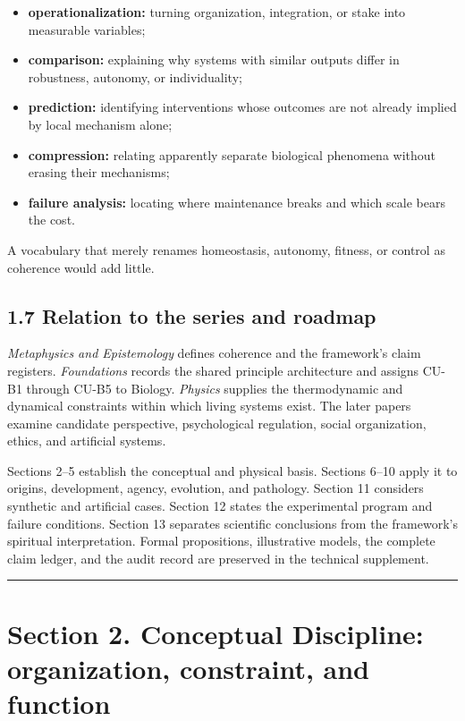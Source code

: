 \documentclass[
  11pt,
]{article}
\providecommand{\tightlist}{%
  \setlength{\itemsep}{0pt}\setlength{\parskip}{0pt}}
\begin{document}
\begin{itemize}
\tightlist
\item
  \textbf{operationalization:} turning organization, integration, or
  stake into measurable variables;
\item
  \textbf{comparison:} explaining why systems with similar outputs
  differ in robustness, autonomy, or individuality;
\item
  \textbf{prediction:} identifying interventions whose outcomes are not
  already implied by local mechanism alone;
\item
  \textbf{compression:} relating apparently separate biological
  phenomena without erasing their mechanisms;
\item
  \textbf{failure analysis:} locating where maintenance breaks and which
  scale bears the cost.
\end{itemize}

A vocabulary that merely renames homeostasis, autonomy, fitness, or
control as coherence would add little.

\subsection{1.7 Relation to the series and
roadmap}\label{relation-to-the-series-and-roadmap}

\emph{Metaphysics and Epistemology} defines coherence and the
framework's claim registers. \emph{Foundations} records the shared
principle architecture and assigns CU-B1 through CU-B5 to Biology.
\emph{Physics} supplies the thermodynamic and dynamical constraints
within which living systems exist. The later papers examine candidate
perspective, psychological regulation, social organization, ethics, and
artificial systems.

Sections 2--5 establish the conceptual and physical basis. Sections
6--10 apply it to origins, development, agency, evolution, and
pathology. Section 11 considers synthetic and artificial cases. Section
12 states the experimental program and failure conditions. Section 13
separates scientific conclusions from the framework's spiritual
interpretation. Formal propositions, illustrative models, the complete
claim ledger, and the audit record are preserved in the technical
supplement.

\begin{center}\rule{0.5\linewidth}{0.5pt}\end{center}

\section{Section 2. Conceptual Discipline: organization, constraint, and
function}\label{section-2.-conceptual-discipline-organization-constraint-and-function}
\end{document}
